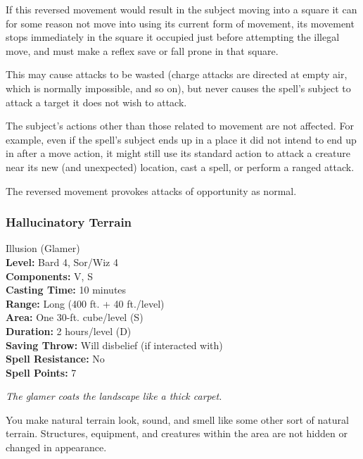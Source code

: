If this reversed movement would result in the subject moving into a square it can for some reason not move into using
its current form of movement, its movement stops immediately in the square it occupied just before attempting the illegal move,
and must make a reflex save or fall prone in that square.

This may cause attacks to be wasted (charge attacks are directed at empty air, which is normally impossible, and so on), 
but never causes the spell's subject to attack a target it does not wish to attack.

The subject's actions other than those related to movement are not affected. For example, even if the spell's subject
ends up in a place it did not intend to end up in after a move action, it might still use its standard action to attack a creature
near its new (and unexpected) location, cast a spell, or perform a ranged attack.

The reversed movement provokes attacks of opportunity as normal.


\subsubsection{Hallucinatory Terrain}
\label{Spell:HallucinatoryTerrain}
Illusion (Glamer)
\\ \textbf{Level:} Bard 4, Sor/Wiz 4
\\ \textbf{Components:} V, S
\\ \textbf{Casting Time:} 10 minutes
\\ \textbf{Range:} Long (400 ft. + 40 ft./level)
\\ \textbf{Area:} One 30-ft. cube/level (S)
\\ \textbf{Duration:} 2 hours/level (D)
\\ \textbf{Saving Throw:} Will disbelief (if interacted with)
\\ \textbf{Spell Resistance:} No
\\ \textbf{Spell Points:} 7

\emph{The glamer coats the landscape like a thick carpet.}

You make natural terrain look, sound, and smell like some other sort of natural terrain. 
Structures, equipment, and creatures within the area are not hidden or changed in appearance.

